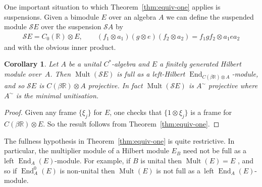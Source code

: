 \documentclass[pdftex]{sigma}
\numberwithin{equation}{section}
\newtheorem{corl}[thm]{Corollary}
 { \theoremstyle{definition}
\newtheorem{defn}[thm]{Definition}
\newtheorem{Example}[thm]{Example}
\newtheorem{rmk}[thm]{Remark}}
\DeclareMathOperator{\End}{End} %
\DeclareMathOperator{\Mult}{Mult} %
\renewcommand{\S}{\mathcal{S}}
\newcommand{\ox}{\otimes} %
\newcommand{\R}{\mathbb{R}} %
\begin{document}
One important situation to which Theorem~\ref{thm:equiv-one} applies is suspensions. Given a bimodule $E$ over an algebra $A$ we can def\/ine the suspended module $\S E$ over the suspension $\S A$ by
\begin{gather*}
\S E=C_0(\R)\ox E,\qquad (f_1\ox a_1)(g\ox e)(f_2\ox a_2) =f_1gf_2\ox a_1ea_2
\end{gather*}
and with the obvious inner product.

\begin{corl}\label{lem:suspensions} Let $A$ be a unital $C^*$-algebra and $E$ a finitely generated Hilbert module over~$A$. Then $\Mult(\S E)$ is full as a left-Hilbert $\End_{C(\beta\R)\ox A}$-module, and so $\S E$ is $C(\beta\R)\ox A$ projective. In fact $\Mult(\S E)$ is $A^\sim$ projective where $A^\sim$ is the minimal unitisation.
\end{corl}

\begin{proof}
Given any frame $\{\xi_j\}$ for $E$, one checks that $\{1\ox\xi_j\}$ is a frame for $C(\beta\R)\ox E$. So the result follows from Theorem~\ref{thm:equiv-one}.
\end{proof}

The fullness hypothesis in Theorem~\ref{thm:equiv-one} is quite restrictive. In particular, the multiplier module of a Hilbert module ${E_B}$ need not be full as a left $\End_A(E)$-module. For example, if $B$ is unital then $\Mult(E) = E$ \cite{ER}, and so if $\End_A^0(E)$ is non-unital then $\Mult(E)$ is not full as a~left $\End_A(E)$-module.
\end{document}
